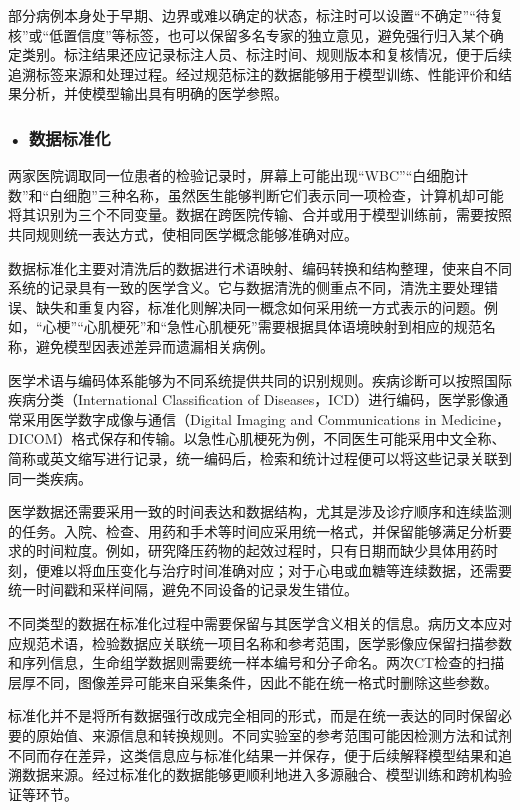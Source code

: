 部分病例本身处于早期、边界或难以确定的状态，标注时可以设置“不确定”“待复核”或“低置信度”等标签，也可以保留多名专家的独立意见，避免强行归入某个确定类别。标注结果还应记录标注人员、标注时间、规则版本和复核情况，便于后续追溯标签来源和处理过程。经过规范标注的数据能够用于模型训练、性能评价和结果分析，并使模型输出具有明确的医学参照。


\subsubsection*{\textbf{• 数据标准化}}

两家医院调取同一位患者的检验记录时，屏幕上可能出现“WBC”“白细胞计数”和“白细胞”三种名称，虽然医生能够判断它们表示同一项检查，计算机却可能将其识别为三个不同变量。数据在跨医院传输、合并或用于模型训练前，需要按照共同规则统一表达方式，使相同医学概念能够准确对应。

数据标准化主要对清洗后的数据进行术语映射、编码转换和结构整理，使来自不同系统的记录具有一致的医学含义。它与数据清洗的侧重点不同，清洗主要处理错误、缺失和重复内容，标准化则解决同一概念如何采用统一方式表示的问题。例如，“心梗”“心肌梗死”和“急性心肌梗死”需要根据具体语境映射到相应的规范名称，避免模型因表述差异而遗漏相关病例。

医学术语与编码体系能够为不同系统提供共同的识别规则。疾病诊断可以按照国际疾病分类（International Classification of Diseases，ICD）进行编码，医学影像通常采用医学数字成像与通信（Digital Imaging and Communications in Medicine，DICOM）格式保存和传输。以急性心肌梗死为例，不同医生可能采用中文全称、简称或英文缩写进行记录，统一编码后，检索和统计过程便可以将这些记录关联到同一类疾病。

医学数据还需要采用一致的时间表达和数据结构，尤其是涉及诊疗顺序和连续监测的任务。入院、检查、用药和手术等时间应采用统一格式，并保留能够满足分析要求的时间粒度。例如，研究降压药物的起效过程时，只有日期而缺少具体用药时刻，便难以将血压变化与治疗时间准确对应；对于心电或血糖等连续数据，还需要统一时间戳和采样间隔，避免不同设备的记录发生错位。

不同类型的数据在标准化过程中需要保留与其医学含义相关的信息。病历文本应对应规范术语，检验数据应关联统一项目名称和参考范围，医学影像应保留扫描参数和序列信息，生命组学数据则需要统一样本编号和分子命名。两次CT检查的扫描层厚不同，图像差异可能来自采集条件，因此不能在统一格式时删除这些参数。

标准化并不是将所有数据强行改成完全相同的形式，而是在统一表达的同时保留必要的原始值、来源信息和转换规则。不同实验室的参考范围可能因检测方法和试剂不同而存在差异，这类信息应与标准化结果一并保存，便于后续解释模型结果和追溯数据来源。经过标准化的数据能够更顺利地进入多源融合、模型训练和跨机构验证等环节。

